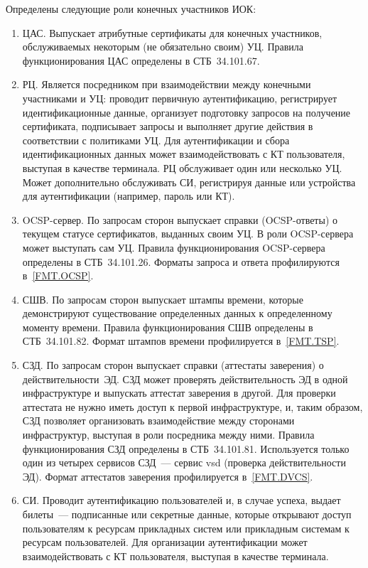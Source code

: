 Определены следующие роли конечных участников ИОК:
\begin{enumerate}
\item
ЦАС. Выпускает атрибутные сертификаты для конечных участников, обслуживаемых
некоторым (не обязательно своим) УЦ. Правила функционирования ЦАС определены в
СТБ~34.101.67.

\item
РЦ. Является посредником при взаимодействии между конечными участниками и УЦ:
проводит первичную аутентификацию, регистрирует идентификационные данные,
организует подготовку запросов на получение сертификата, подписывает
запросы и выполняет другие действия в соответствии с политиками УЦ.
%
Для аутентификации и сбора идентификационных данных может взаимодействовать с КТ
пользователя, выступая в качестве терминала.
%  
РЦ обслуживает один или несколько УЦ. Может дополнительно обслуживать СИ,
регистрируя данные или устройства для аутентификации (например, пароль или КТ). 

\item
OCSP-сервер. По запросам сторон выпускает справки (OCSP-ответы) о текущем
статусе сертификатов, выданных своим УЦ. В роли OCSP-сервера может выступать сам
УЦ. Правила функционирования OCSP-сервера определены в СТБ~34.101.26.
%
Форматы запроса и ответа профилируются в~\ref{FMT.OCSP}.

\item
СШВ. По запросам сторон выпускает штампы времени, которые демонстрируют
существование определенных данных к определенному моменту времени. Правила
функционирования СШВ определены в СТБ~34.101.82.
%
Формат штампов времени профилируется в~\ref{FMT.TSP}.

\item
СЗД. По запросам сторон выпускает справки (аттестаты заверения) о
действительности~ЭД.
%
СЗД может проверять действительность ЭД в одной инфраструктуре и выпускать
аттестат заверения в другой. Для проверки аттестата не нужно иметь доступ к
первой инфраструктуре, и, таким образом, СЗД позволяет организовать
взаимодействие между сторонами инфраструктур, выступая в роли посредника между
ними.
%
Правила функционирования СЗД определены в СТБ~34.101.81. Используется только
один из четырех сервисов СЗД~--- сервис vsd (проверка действительности ЭД).
%
Формат аттестатов заверения профилируется в~\ref{FMT.DVCS}.

\item
СИ. Проводит аутентификацию пользователей и, в случае успеха, выдает билеты~---
подписанные или секретные данные, которые открывают доступ пользователям к
ресурсам прикладных систем или прикладным системам к ресурсам пользователей. Для
организации аутентификации может взаимодействовать с КТ пользователя, выступая в
качестве терминала.


\end{enumerate}
